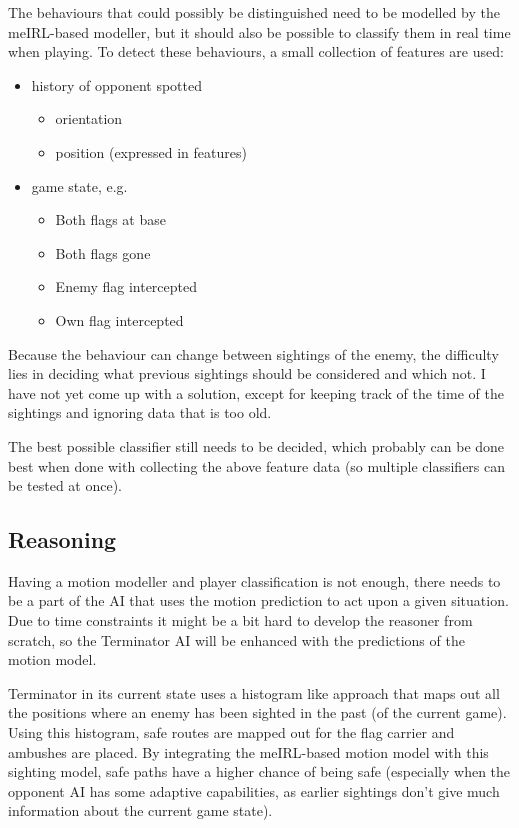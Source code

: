 \documentclass[a4paper, 12pt]{article}
\begin{document}
The behaviours that could possibly be distinguished need to be modelled by the
meIRL-based modeller, but it should also be possible to classify them in real time when playing.
To detect these behaviours, a small collection of features are used:
\begin{itemize}
    \item history of opponent spotted
        \begin{itemize}
            \item orientation
            \item position (expressed in features)
        \end{itemize}
    \item game state, e.g.
        \begin{itemize}
            \item Both flags at base
            \item Both flags gone
            \item Enemy flag intercepted
            \item Own flag intercepted
        \end{itemize}
\end{itemize}

Because the behaviour can change between sightings of the enemy, the difficulty
lies in deciding what previous sightings should be considered and which not. I
have not yet come up with a solution, except for keeping track of the time of
the sightings and ignoring data that is too old.

The best possible classifier still needs to be decided, which probably can be
done best when done with collecting the above feature data (so multiple
classifiers can be tested at once).

\subsection{Reasoning}
Having a motion modeller and player classification is not enough, there needs to
be a part of the AI that uses the motion prediction to act upon a given
situation. Due to time constraints it might be a bit hard to develop the
reasoner from scratch, so the Terminator AI will be enhanced with the
predictions of the motion model.

Terminator in its current state uses a histogram like approach that maps out all
the positions where an enemy has been sighted in the past (of the current game).
Using this histogram, safe routes are mapped out for the flag carrier and
ambushes are placed.
By integrating the meIRL-based motion model with this sighting model, safe paths
have a higher chance of being safe (especially when the opponent AI has some
adaptive capabilities, as earlier sightings don't give much information about
the current game state). 
\end{document}
